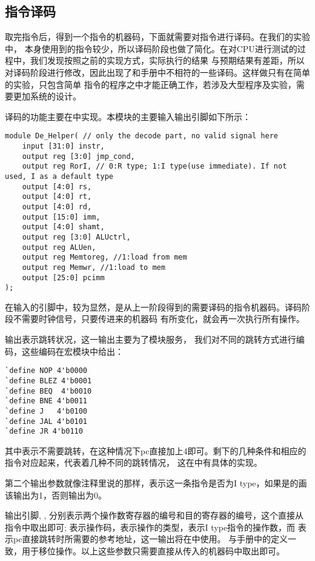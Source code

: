 \subsection{指令译码}
\songti
\hspace*{5mm}取完指令后，得到一个指令的机器码，下面就需要对指令进行译码。在我们的实验中，
本身使用到的指令较少，所以译码阶段也做了简化。在对CPU进行测试的过程中，我们发现按照之前的实现方式，实际执行的结果
与预期结果有差距，所以对译码阶段进行修改，因此出现了和手册中不相符的一些译码。这样做只有在简单的实验，只包含简单
指令的程序之中才能正确工作，若涉及大型程序及实验，需要更加系统的设计。

译码的功能主要在中实现。本模块的主要输入输出引脚如下所示：
\begin{lstlisting}[style = verilog-style, caption={input/output of decode}]
module De_Helper( // only the decode part, no valid signal here
	input [31:0] instr,
	output reg [3:0] jmp_cond,
	output reg RorI, // 0:R type; 1:I type(use immediate). If not used, I as a default type
	output [4:0] rs,
	output [4:0] rt,
	output [4:0] rd,
	output [15:0] imm,
	output [4:0] shamt,
	output reg [3:0] ALUctrl,
	output reg ALUen,
	output reg Memtoreg, //1:load from mem
	output reg Memwr, //1:load to mem
	output [25:0] pcimm
);
\end{lstlisting}

\kaishu
在输入的引脚中，较为显然，是从上一阶段得到的需要译码的指令机器码。译码阶段不需要时钟信号，只要传进来的机器码
有所变化，就会再一次执行所有操作。

输出表示跳转状况，这一输出主要为了模块服务，
我们对不同的跳转方式进行编码，这些编码在宏模块中给出：
\begin{lstlisting}[style = verilog-style, caption={Type of jmp\_cond}]
`define NOP 4'b0000
`define BLEZ 4'b0001
`define BEQ  4'b0010
`define BNE 4'b0011
`define J   4'b0100
`define JAL 4'b0101
`define JR 4'b0110
\end{lstlisting}

其中表示不需要跳转，在这种情况下pc直接加上4即可。剩下的几种条件和相应的指令对应起来，代表着几种不同的跳转情况，
这在中有具体的实现。

第二个输出参数就像注释里说的那样，表示这一条指令是否为I type，如果是的画该输出为1，否则输出为0。

输出引脚, , 分别表示两个操作数寄存器的编号和目的寄存器的编号，这个直接从指令中取出即可;
表示操作码，表示操作的类型，表示I type指令的操作数，而
表示pc直接跳转时所需要的参考地址，这一输出将在中使用。
与手册中的定义一致，用于移位操作。以上这些参数只需要直接从传入的机器码中取出即可。

